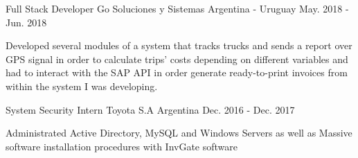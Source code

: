 \begin{cventries}
\cventry
{Full Stack Developer} %
{Go Soluciones y Sistemas} %
{Argentina - Uruguay} %
{May. 2018 - Jun. 2018} %
{
\begin{cvitems} %
\item {Developed several modules of a system that tracks trucks and sends a report over GPS signal in order to calculate trips' costs depending on different variables and had to interact with the SAP API in order generate ready-to-print invoices from within the system I was developing.}
\end{cvitems}
}

\cventry
{System Security Intern} %
{Toyota S.A} %
{Argentina} %
{Dec. 2016 - Dec. 2017} %
{
\begin{cvitems} %
\item {Administrated Active Directory, MySQL and Windows Servers as well as Massive software installation procedures with InvGate software}
\end{cvitems}
}
\end{cventries}
